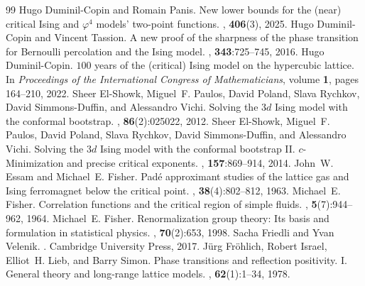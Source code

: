 \documentclass[10pt,a4paper]{amsart}
\numberwithin{equation}{section}
\begin{document}
\begin{thebibliography}{99}
 Hugo Duminil-Copin and Romain Panis. \newblock New lower bounds for the (near) critical {I}sing and $\varphi^4$ models’ two-point functions. , \textbf{406}(3), 2025.
 Hugo Duminil-Copin and Vincent Tassion. \newblock A new proof of the sharpness of the phase transition for {B}ernoulli percolation and the {I}sing model. , \textbf{343}:725--745, 2016.
 Hugo Duminil-Copin. \newblock $100$ years of the (critical) {I}sing model on the hypercubic lattice. \newblock In {\em Proceedings of the International Congress of Mathematicians}, volume \textbf{1}, pages 164--210, 2022.
 Sheer El-Showk, Miguel~F. Paulos, David Poland, Slava Rychkov, David Simmons-Duffin, and Alessandro Vichi. \newblock Solving the $3d$ {I}sing model with the conformal bootstrap. , \textbf{86}(2):025022, 2012.
 Sheer El-Showk, Miguel~F. Paulos, David Poland, Slava Rychkov, David Simmons-Duffin, and Alessandro Vichi. \newblock Solving the $3d$ {I}sing model with the conformal bootstrap {II}. $c$-{M}inimization and precise critical exponents. , \textbf{157}:869--914, 2014.
 John~W. Essam and Michael~E. Fisher. \newblock Pad{\'e} approximant studies of the lattice gas and {I}sing ferromagnet below the critical point. , \textbf{38}(4):802--812, 1963.
 Michael~E. Fisher. \newblock Correlation functions and the critical region of simple fluids. , \textbf{5}(7):944--962, 1964.
 Michael~E. Fisher. \newblock Renormalization group theory: {I}ts basis and formulation in statistical physics. , \textbf{70}(2):653, 1998.
 Sacha Friedli and Yvan Velenik. . \newblock Cambridge University Press, 2017.
 J{\"u}rg Fr{\"o}hlich, Robert Israel, Elliot~H. Lieb, and Barry Simon. \newblock Phase transitions and reflection positivity. {I}. {G}eneral theory and long-range lattice models. , \textbf{62}(1):1--34, 1978.

\end{thebibliography}
\end{document}
